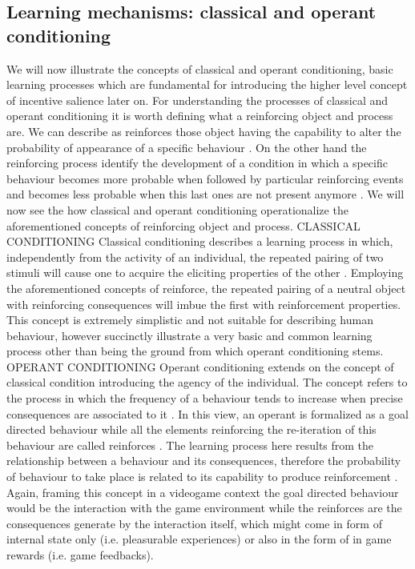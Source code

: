 \subsection{Learning mechanisms: classical and operant conditioning}
\label{classical_operant_cond}
We will now illustrate the concepts of classical and operant conditioning, basic learning processes which are fundamental for introducing the higher level concept of incentive salience later on. For understanding the processes of classical and operant conditioning it is worth defining what a reinforcing object and process are. We can describe as reinforces those object having the capability to alter the probability of appearance of a specific behaviour \cite{kling1971woodworth,skinner1953science,squire2012fundamental}.  On the other hand the reinforcing process identify the development of a condition in which a specific behaviour becomes more probable when followed by particular reinforcing events and becomes less probable when this last ones are not present anymore \cite{kling1971woodworth}. We will now see the how classical and operant conditioning operationalize the aforementioned concepts of reinforcing object and process.
CLASSICAL CONDITIONING
Classical conditioning describes a learning process in which, independently from the activity of an individual, the repeated pairing of two stimuli will cause one to acquire the eliciting properties of the other \cite{squire2012fundamental}. Employing the aforementioned concepts of reinforce, the repeated pairing of a neutral object with reinforcing consequences will imbue the first with reinforcement properties. This concept is extremely simplistic and not suitable for describing human behaviour, however succinctly illustrate a very basic and common learning process other than being the ground from which operant conditioning stems.
OPERANT CONDITIONING
Operant conditioning extends on the concept of classical condition introducing the agency of the individual. The concept refers to the process in which the frequency of a behaviour tends to increase when precise consequences are associated to it \cite{skinner1953science}. In this view, an operant is formalized as a goal directed behaviour while all the elements reinforcing the re-iteration of this behaviour are called reinforces \cite{skinner1953science}. The learning process here results from the relationship between a behaviour and its consequences, therefore the probability of behaviour to take place is related to its capability to produce reinforcement \cite{kling1971woodworth}. Again, framing this concept in a videogame context the goal directed behaviour would be the interaction with the game environment while the reinforces are the consequences generate by the interaction itself, which might come in form of internal state only (i.e. pleasurable experiences) or also in the form of in game rewards (i.e. game feedbacks). 

